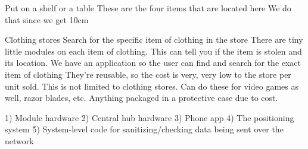 Put on a shelf or a table
These are the four items that are located here
We do that since we get 10cm

Clothing stores
Search for the specific item of clothing in the store
There are tiny little modules on each item of clothing.
This can tell you if the item is stolen and its location.
We have an application so the user can find and search for the exact item of clothing
They're reusable, so the cost is very, very low to the store per unit sold.
This is not limited to clothing stores.
Can do these for video games as well, razor blades, etc. Anything packaged in a protective case due to cost.

1) Module hardware
2) Central hub hardware
3) Phone app
4) The positioning system
5) System-level code for sanitizing/checking data being sent over the network
